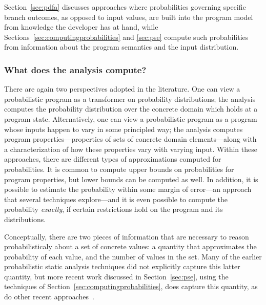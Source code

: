 Section~\ref{sec:pdfa} discusses approaches where probabilities
governing specific branch outcomes, as opposed to input values,
are built into the program model from knowledge the developer
has at hand, while Sections~\ref{sec:computingprobabilities}
and \ref{sec:pse} compute such probabilities from information about
the program semantics and the input distribution.

\subsubsection{What does the analysis compute?}
There are again two perspectives adopted in the literature.
One can view a probabilistic program as a transformer on probability
distributions; the analysis computes the probability distribution over the
concrete domain which holds at a program state.
Alternatively, one can view a probabilistic program as a program 
whose inputs happen
to vary in some principled way; the analysis computes program 
properties---properties of sets of concrete domain elements---along with a characterization
of how these properties vary with varying input.
Within these approaches, there are different types of approximations
computed for probabilities.  It is common to compute upper bounds
on probabilities for program properties, but lower bounds can 
be computed as well.  In addition, it is possible to estimate the
probability within some margin of error---an approach that several
techniques explore---and it is even possible to compute the probability
\textit{exactly}, if certain restrictions hold on the program and its distributions.

Conceptually, there are two pieces of information that are necessary
to reason probabilisticaly about a set of concrete values: a quantity
that approximates the probability of each value, and the number of
values in the set.  Many of the earlier probabilistic static analysis
techniques did not explicitly capture this latter quantity, but
more recent work discussed in Section~\ref{sec:pse}, using the
techniques of Section~\ref{sec:computingprobabilities}, 
does capture this quantity, as do other
recent approaches~\cite{mardziel2013dynamic}.



